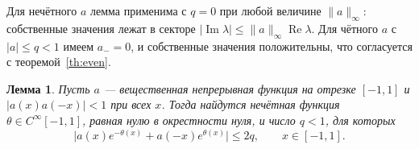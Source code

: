 \documentclass[12pt,a4paper]{article}
\newtheorem{lemma}{Лемма}
\theoremstyle{definition}
\newcommand{\norm}[1]{\lVert#1\rVert}
\newcommand{\abs}[1]{\lvert#1\rvert}
\begin{document}
Для нечётного $a$ лемма применима с $q=0$ при любой величине $\norm a_\infty$:
собственные значения лежат в секторе
$\abs{\operatorname{Im}\lambda}\le\norm a_\infty\operatorname{Re}\lambda$. Для чётного
$a$ с $\abs a\le q<1$ имеем $a_-=0$, и собственные значения положительны, что согласуется
с теоремой~\ref{th:even}.

\begin{lemma}\label{lem:phase}
Пусть $a$ --- вещественная непрерывная функция на отрезке $[-1,1]$ и
$\abs{a(x)a(-x)}<1$ при всех $x$. Тогда найдутся нечётная функция
$\theta\in C^\infty[-1,1]$, равная нулю в окрестности нуля, и число $q<1$, для которых
\begin{equation}\label{eq:phase}
 \bigl\lvert a(x)e^{-\theta(x)}+a(-x)e^{\theta(x)}\bigr\rvert\le2q,\qquad x\in[-1,1].
\end{equation}
\end{lemma}
\end{document}
